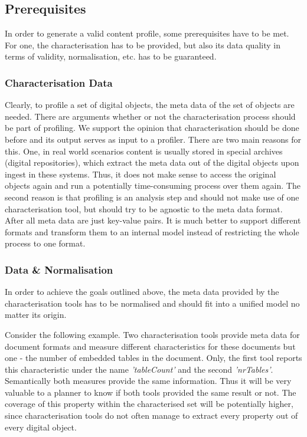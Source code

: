 \subsection{Prerequisites}
In order to generate a valid content profile, some prerequisites have to be met. For one, the characterisation has to be provided, but also its data quality in terms of validity, normalisation, etc. has to be guaranteed.

\subsubsection{Characterisation Data}
Clearly, to profile a set of digital objects, the meta data of the set of objects are needed. There are arguments whether or not the characterisation process should be part of profiling. We support the opinion that characterisation should be done before and its output serves as input to a profiler. There are two main reasons for this. One, in real world scenarios content is usually stored in special archives (digital repositories), which extract the meta data out of the digital objects upon ingest in these systems. Thus, it does not make sense to access the original objects again and run a potentially time-consuming process over them again. The second reason is that profiling is an analysis step and should not make use of one characterisation tool, but should try to be agnostic to the meta data format. After all meta data are just key-value pairs. It is much better to support different formats and transform them to an internal model instead of restricting the whole process to one format.

\subsubsection{Data \& Normalisation}
In order to achieve the goals outlined above, the meta data provided by the characterisation tools has to be normalised and should fit into a unified model no matter its origin.

Consider the following example. Two characterisation tools provide meta data for document formats and measure different characteristics for these documents but one - the number of embedded tables in the document. Only, the first tool reports this characteristic under the name \textit{'tableCount'} and the second \textit{'nrTables'}. Semantically both measures provide the same information. Thus it will be very valuable to a planner to know if both tools provided the same result or not. The coverage of this property within the characterised set will be potentially higher, since characterisation tools do not often manage to extract every property out of every digital object.

